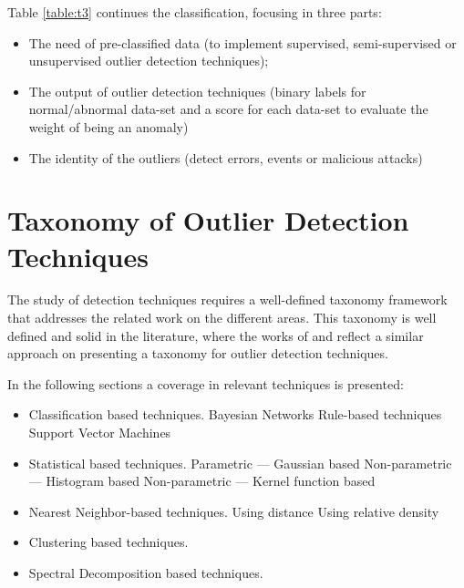 Table \ref{table:t3} continues the classification, focusing in three parts: 
\begin{itemize}
		\setlength\itemsep{-0.5em}
		\item The need of pre-classified data (to implement supervised, semi-supervised or unsupervised outlier detection techniques);
		
		\item The output of outlier detection techniques (binary labels for normal/abnormal data-set and a score for each data-set to evaluate the weight of being an anomaly)
		
		\item The identity of the outliers (detect errors, events or malicious attacks)
\end{itemize}

\newpage

%

\vspace{2em}



\section{Taxonomy of Outlier Detection Techniques}
\label{sec:taxon}
The study of detection techniques requires a well-defined taxonomy framework that addresses the related work on the different areas. This taxonomy is well defined and solid in the literature, where the works of \cite{gen:zhang:2010} and \cite{gen:chandola:2009} reflect a similar approach on presenting a taxonomy for outlier detection techniques.

In the following sections a coverage in relevant techniques is presented:

\begin{itemize}
	\setlength\itemsep{-0.5em}
	\item Classification based techniques.
	\subitem Bayesian Networks
	\subitem Rule-based techniques
	\subitem Support Vector Machines
	
	\item Statistical based techniques.
	\subitem Parametric --- Gaussian based
	\subitem Non-parametric --- Histogram based
	\subitem Non-parametric --- Kernel function based
	
	\item Nearest Neighbor-based techniques.
	\subitem Using distance
	\subitem Using relative density
	
	\item Clustering based techniques.
	
	\item Spectral Decomposition based techniques.
	
\end{itemize}












